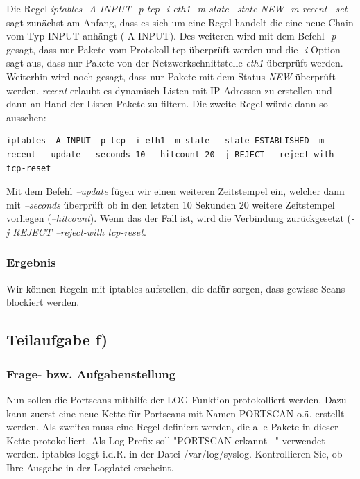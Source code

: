 Die Regel \textit{iptables -A INPUT -p tcp -i eth1 -m state --state NEW -m recent --set} sagt zunächst am Anfang, dass es sich um eine Regel handelt die eine neue Chain vom Typ INPUT anhängt (-A INPUT). Des weiteren wird mit dem Befehl \textit{-p} gesagt, dass nur Pakete vom Protokoll tcp überprüft werden und die \textit{-i} Option sagt aus, dass nur Pakete von der Netzwerkschnittstelle \textit{eth1} überprüft werden. Weiterhin wird noch gesagt, dass nur Pakete mit dem Status \textit{NEW} überprüft werden. \textit{recent} erlaubt es dynamisch Listen mit IP-Adressen zu erstellen und dann an Hand der Listen Pakete zu filtern. Die zweite Regel würde dann so aussehen:

\begin{lstlisting}[caption={iptables mit "recent"}]
iptables -A INPUT -p tcp -i eth1 -m state --state ESTABLISHED -m recent --update --seconds 10 --hitcount 20 -j REJECT --reject-with tcp-reset
\end{lstlisting}

Mit dem Befehl \textit{--update} fügen wir einen weiteren Zeitstempel ein, welcher dann mit \textit{--seconds} überprüft ob in den letzten 10 Sekunden 20 weitere Zeitstempel vorliegen (\textit{--hitcount}). Wenn das der Fall ist, wird die Verbindung zurückgesetzt (\textit{-j REJECT --reject-with tcp-reset}.


\subsubsection{Ergebnis}

Wir können Regeln mit iptables aufstellen, die dafür sorgen, dass gewisse Scans blockiert werden.

\subsection{Teilaufgabe f)} \cite{5}

\subsubsection{Frage- bzw. Aufgabenstellung}

Nun sollen die Portscans mithilfe der LOG-Funktion protokolliert werden. Dazu kann zuerst eine neue Kette für Portscans mit Namen PORTSCAN o.ä. erstellt werden. Als zweites muss eine Regel definiert werden, die alle Pakete in dieser Kette protokolliert. Als Log-Prefix soll "PORTSCAN erkannt --" verwendet werden. iptables loggt i.d.R. in der Datei /var/log/syslog. Kontrollieren Sie, ob Ihre Ausgabe in der Logdatei erscheint.

